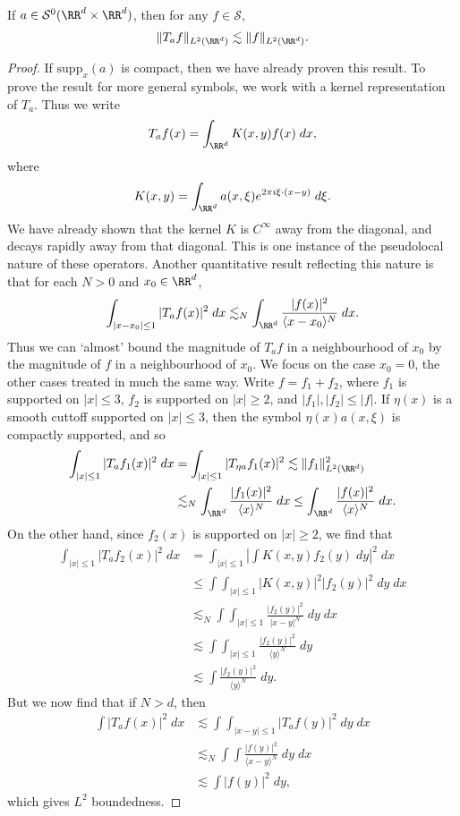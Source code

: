 \begin{theorem}
    If $a \in \mathcal{S}^0(\RR^d \times \RR^d)$, then for any $f \in \mathcal{S}$,
    \[ \| T_af \|_{L^2(\RR^d)} \lesssim \| f \|_{L^2(\RR^d)}. \]
\end{theorem}
\begin{proof}
    If $\text{supp}_x(a)$ is compact, then we have already proven this result. To prove the result for more general symbols, we work with a kernel representation of $T_a$. Thus we write
    \[ T_af(x) = \int_{\RR^d} K(x,y) f(x)\; dx, \]
    where
    \[ K(x,y) = \int_{\RR^d} a(x,\xi) e^{2 \pi i \xi \cdot (x - y)}\; d\xi. \]
    We have already shown that the kernel $K$ is $C^\infty$ away from the diagonal, and decays rapidly away from that diagonal. This is one instance of the pseudolocal nature of these operators. Another quantitative result reflecting this nature is that for each $N > 0$ and $x_0 \in \RR^d$,
    \[ \int_{|x - x_0| \leq 1} |T_af(x)|^2\; dx \lesssim_N \int_{\RR^d} \frac{|f(x)|^2}{\langle x - x_0 \rangle^N}\; dx. \]
    Thus we can `almost' bound the magnitude of $T_af$ in a neighbourhood of $x_0$ by the magnitude of $f$ in a neighbourhood of $x_0$. We focus on the case $x_0 = 0$, the other cases treated in much the same way. Write $f = f_1 + f_2$, where $f_1$ is supported on $|x| \leq 3$, $f_2$ is supported on $|x| \geq 2$, and $|f_1|, |f_2| \leq |f|$. If $\eta(x)$ is a smooth cuttoff supported on $|x| \leq 3$, then the symbol $\eta(x) a(x,\xi)$ is compactly supported, and so
    \begin{align*}
        \int_{|x| \leq 1} |T_a f_1(x)|^2\; dx &= \int_{|x| \leq 1} |T_{\eta a} f_1(x)|^2 \lesssim \| f_1 \|_{L^2(\RR^d)}^2\\
        &\lesssim_N \int_{\RR^d} \frac{|f_1(x)|^2}{\langle x \rangle^N}\; dx \leq \int_{\RR^d} \frac{|f(x)|^2}{\langle x \rangle^N}\; dx.
    \end{align*}
    On the other hand, since $f_2(x)$ is supported on $|x| \geq 2$, we find that
    \begin{align*}
        \int_{|x| \leq 1} |T_a f_2(x)|^2\; dx &= \int_{|x| \leq 1} \left| \int K(x,y) f_2(y)\; dy \right|^2\; dx\\
        &\leq \int \int_{|x| \leq 1} |K(x,y)|^2 |f_2(y)|^2\; dy\; dx\\
        &\lesssim_N \int \int_{|x| \leq 1} \frac{|f_2(y)|^2}{|x - y|^N}\; dy\; dx\\
        &\lesssim \int \int_{|x| \leq 1} \frac{|f_2(y)|^2}{\langle y \rangle^N}\; dy\\
        &\lesssim \int \frac{|f_2(y)|^2}{\langle y \rangle^N}\; dy.
    \end{align*}
    But we now find that if $N > d$, then
    \begin{align*}
        \int |T_af(x)|^2\; dx &\lesssim \int \int_{|x - y| \leq 1} |T_af(y)|^2\; dy\; dx\\
        &\lesssim_N \int \int \frac{|f(y)|^2}{\langle x - y \rangle^N}\; dy\; dx\\
        &\lesssim \int |f(y)|^2\; dy,
    \end{align*}
    which gives $L^2$ boundedness.
\end{proof}

